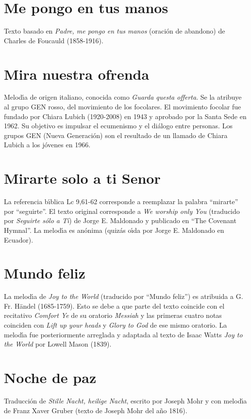 \documentclass[landscape,12pt]{report}
\begin{document}
\section*{\small Me pongo en tus manos} \noindent\footnotesize Texto basado en \textit{Padre, me pongo en tus manos} (oraci\'on de abandono) de Charles de Foucauld (1858-1916). 
\section*{\small Mira nuestra ofrenda} \noindent\footnotesize Melod\'\i a de origen italiano, conocida como \textit{Guarda questa offerta}. Se la atribuye al grupo GEN rosso, del movimiento de los focolares. El movimiento focolar fue fundado por Chiara Lubich (1920-2008) en 1943 y aprobado por la Santa Sede en 1962. Su objetivo es impulsar el ecumenismo y el di\'alogo entre personas. Los grupos GEN (Nueva Generaci\'on) son el resultado de un llamado de Chiara Lubich a los j\'ovenes en 1966.
\section*{\small Mirarte solo a ti Senor} \noindent\footnotesize La referencia b\'\i blica Lc 9,61-62 corresponde a reemplazar la palabra ``mirarte'' por ``seguirte''. El texto original corresponde a \textit{We worship only You} (traducido por \textit{Seguirte s\'olo a T\'\i }) de Jorge E. Maldonado y publicado en ``The Covenant Hymnal''. La melod\'\i a es an\'onima (quiz\'as o\'\i da por Jorge E. Maldonado en Ecuador).  
\section*{\small Mundo feliz} \noindent\footnotesize La melod\'\i a de \textit{Joy to the World} (traducido por ``Mundo feliz'') es atribuida a G. Fr. H\"andel (1685-1759). Esto se debe a que parte del texto coincide con el recitativo \textit{Comfort Ye} de su oratorio \textit{Messiah} y las primeras cuatro notas coinciden con \textit{Lift up your heads} y \textit{Glory to God} de ese mismo oratorio. La melod\'\i a fue posteriormente arreglada  y adaptada al texto de Isaac Watts \textit{Joy to the World} por Lowell Mason (1839).
\section*{\small Noche de paz} \noindent\footnotesize Traducci\'on de \textit{Stille Nacht, heilige Nacht}, escrito por Joseph Mohr y con melod\'\i a de Franz Xaver Gruber (texto de Joseph Mohr del a\~no 1816).
\end{document}
